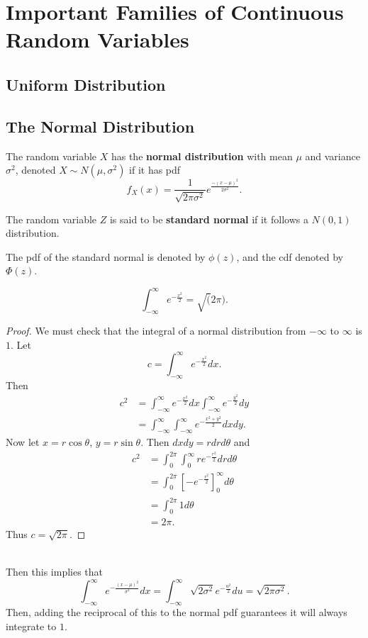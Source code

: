 \section{Important Families of Continuous Random Variables}

\subsection{Uniform Distribution}


\subsection{The Normal Distribution}
\begin{definition}
  The random variable $X$ has the {\bf normal distribution} with mean $\mu$ and variance $\sigma ^2$, denoted $X \sim N(\mu, \sigma^2)$ if it has pdf
  \[f_X(x) = \frac{1}{\sqrt{2 \pi \sigma ^2}} e ^{\frac{- (x - \mu)^2}{2 \sigma^2}}.\]
\end{definition}

\begin{definition}
    
The random variable $Z$ is said to be {\bf standard normal} if it follows a $N(0, 1) $ distribution.

  The pdf of the standard normal is denoted by $\phi(z)$, and the cdf denoted by $\Phi(z)$.
\end{definition}

\begin{theorem}
  \[\int_{-\infty}^\infty e^{- \frac{x^2}{2}} = \sqrt(2\pi).\]
\end{theorem}
\begin{proof}
  We must check that the integral of a normal distribution from $- \infty$ to $\infty$ is $1$. Let 
  \[c = \int_{-\infty}^\infty e^{ - \frac{x^2}{2}} dx.\]
  Then 
  \begin{align*}
    c^2 &= \int_{-\infty}^\infty e^{ - \frac{x^2}{2}} dx \int_{-\infty}^\infty e^{ - \frac{y^2}{2}} dy \\
        &= \int_{-\infty}^\infty \int_{-\infty}^\infty e^{- \frac{x^2 + y^2}{2}} dx dy
  .\end{align*}
  Now let $x = r \cos \theta$, $y = r \sin \theta$. Then $dx dy = r dr d \theta$ and
  \begin{align*}
    c^2 &= \int_0^{2\pi} \int_{0}^\infty r e^{ - \frac{r^2}{2}} dr d\theta \\
        &= \int_0^{2\pi} \left[ - e^{- \frac{r^2}{2}} \right]_0^{\infty} d\theta \\
        &= \int_0^{2\pi} 1 d\theta \\
        &= 2 \pi
  .\end{align*}
  Thus $c = \sqrt{2\pi}$.
\end{proof}
$ $ \\
Then this implies that
\[\int_{-\infty}^\infty e^{ - \frac{(x - \mu)^2}{\sigma^2}} dx = \int_{-\infty}^\infty \sqrt{ 2 \sigma^2}  e^{ - \frac{u^2}{2}} du = \sqrt{2 \pi \sigma^2}.\]
Then, adding the reciprocal of this to the normal pdf guarantees it will always integrate to $1$.

